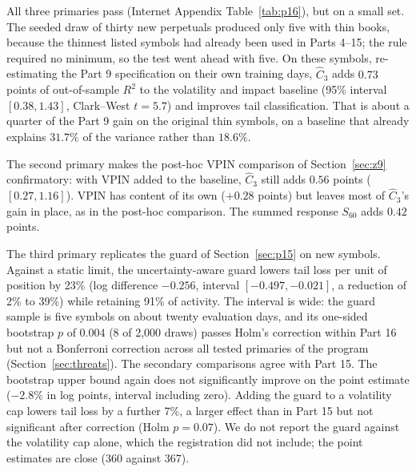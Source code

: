 \documentclass[12pt]{article}
\theoremstyle{definition}
\theoremstyle{remark}
\begin{document}
All three primaries pass (Internet Appendix Table~\ref{tab:p16}), but on a small set. The seeded draw of thirty new perpetuals produced only five with thin books, because the thinnest listed symbols had already been used in Parts 4--15; the rule required no minimum, so the test went ahead with five. On these symbols, re-estimating the Part 9 specification on their own training days, $\hat C_3$ adds $0.73$ points of out-of-sample $R^2$ to the volatility and impact baseline (95\% interval $[0.38,1.43]$, Clark--West $t=5.7$) and improves tail classification. That is about a quarter of the Part 9 gain on the original thin symbols, on a baseline that already explains $31.7\%$ of the variance rather than $18.6\%$.

The second primary makes the post-hoc VPIN comparison of Section~\ref{sec:z9} confirmatory: with VPIN added to the baseline, $\hat C_3$ still adds $0.56$ points ($[0.27,1.16]$). VPIN has content of its own ($+0.28$ points) but leaves most of $\hat C_3$'s gain in place, as in the post-hoc comparison. The summed response $S_{60}$ adds $0.42$ points.

The third primary replicates the guard of Section~\ref{sec:p15} on new symbols. Against a static limit, the uncertainty-aware guard lowers tail loss per unit of position by 23\% (log difference $-0.256$, interval $[-0.497,-0.021]$, a reduction of 2\% to 39\%) while retaining 91\% of activity. The interval is wide: the guard sample is five symbols on about twenty evaluation days, and its one-sided bootstrap $p$ of $0.004$ (8 of 2{,}000 draws) passes Holm's correction within Part 16 but not a Bonferroni correction across all tested primaries of the program (Section~\ref{sec:threats}). The secondary comparisons agree with Part 15. The bootstrap upper bound again does not significantly improve on the point estimate ($-2.8\%$ in log points, interval including zero). Adding the guard to a volatility cap lowers tail loss by a further 7\%, a larger effect than in Part 15 but not significant after correction (Holm $p=0.07$). We do not report the guard against the volatility cap alone, which the registration did not include; the point estimates are close (360 against 367).
\end{document}
